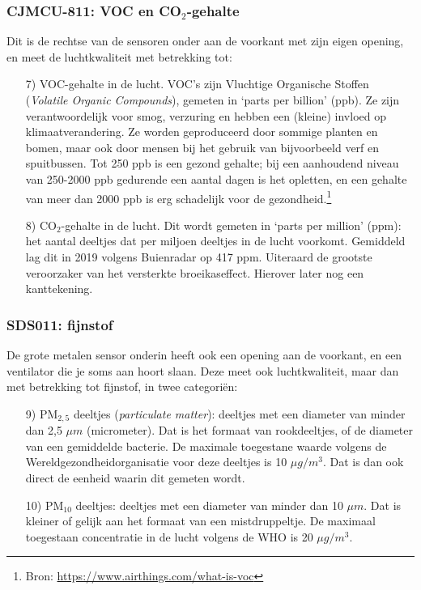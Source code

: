 \documentclass[a4paper,11pt, fleqn]{article}
\begin{document}
\subsubsection{CJMCU-811: VOC en CO$_2$-gehalte}
Dit is de rechtse van de sensoren onder aan de voorkant met zijn eigen opening, en meet de luchtkwaliteit met betrekking tot:
\begin{itemize}
	\item[7)] VOC-gehalte in de lucht. VOC's zijn Vluchtige Organische Stoffen ({\it Volatile Organic Compounds}), gemeten in `parts per billion' (ppb). Ze zijn verantwoordelijk voor smog, verzuring en hebben een (kleine) invloed op klimaatverandering. Ze worden geproduceerd door sommige planten en bomen, maar ook door mensen bij het gebruik van bijvoorbeeld verf en spuitbussen. Tot 250 ppb is een gezond gehalte; bij een aanhoudend niveau van 250-2000 ppb gedurende een aantal dagen is het opletten, en een gehalte van meer dan 2000 ppb is erg schadelijk voor de gezondheid.\footnote{Bron: \href{https://www.airthings.com/what-is-voc}{https://www.airthings.com/what-is-voc}}
	\item[8)] CO$_2$-gehalte in de lucht. Dit wordt gemeten in `parts per million' (ppm): het aantal deeltjes dat per miljoen deeltjes in de lucht voorkomt. Gemiddeld lag dit in 2019 volgens Buienradar op 417 ppm. Uiteraard de grootste veroorzaker van het versterkte broeikaseffect. Hierover later nog een kanttekening.
\end{itemize}

\subsubsection{SDS011: fijnstof}
De grote metalen sensor onderin heeft ook een opening aan de voorkant, en een ventilator die je soms aan hoort slaan. Deze meet ook luchtkwaliteit, maar dan met betrekking tot fijnstof, in twee categori\"en:
\begin{itemize}
	\item[9)] PM$_{2,5}$ deeltjes ({\it particulate matter}): deeltjes met een diameter van minder dan 2,5 $\mu m$ (micrometer). Dat is het formaat van rookdeeltjes, of de diameter van een gemiddelde bacterie. De maximale toegestane waarde volgens de Wereldgezondheidorganisatie voor deze deeltjes is 10 $\mu g/m^3$. Dat is dan ook direct de eenheid waarin dit gemeten wordt.
	\item[10)] PM$_{10}$ deeltjes: deeltjes met een diameter van minder dan 10 $\mu m$. Dat is kleiner of gelijk aan het formaat van een mistdruppeltje. De maximaal toegestaan concentratie in de lucht volgens de WHO is 20 $\mu g/m^3$. 
\end{itemize}
\end{document}
